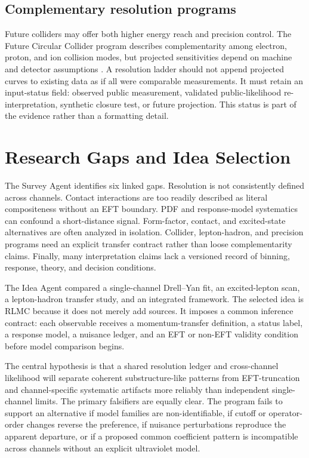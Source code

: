 \documentclass[conference]{../../../../Conference-LaTeX-template_10-17-19/IEEEtran}
\begin{document}
\subsection{Complementary resolution programs}

Future colliders may offer both higher energy reach and precision control. The Future Circular Collider program describes complementarity among electron, proton, and ion collision modes, but projected sensitivities depend on machine and detector assumptions \cite{abada2019}. A resolution ladder should not append projected curves to existing data as if all were comparable measurements. It must retain an input-status field: observed public measurement, validated public-likelihood re-interpretation, synthetic closure test, or future projection. This status is part of the evidence rather than a formatting detail.

\section{Research Gaps and Idea Selection}

The Survey Agent identifies six linked gaps. Resolution is not consistently defined across channels. Contact interactions are too readily described as literal compositeness without an EFT boundary. PDF and response-model systematics can confound a short-distance signal. Form-factor, contact, and excited-state alternatives are often analyzed in isolation. Collider, lepton-hadron, and precision programs need an explicit transfer contract rather than loose complementarity claims. Finally, many interpretation claims lack a versioned record of binning, response, theory, and decision conditions.

The Idea Agent compared a single-channel Drell--Yan fit, an excited-lepton scan, a lepton-hadron transfer study, and an integrated framework. The selected idea is RLMC because it does not merely add sources. It imposes a common inference contract: each observable receives a momentum-transfer definition, a status label, a response model, a nuisance ledger, and an EFT or non-EFT validity condition before model comparison begins.

The central hypothesis is that a shared resolution ledger and cross-channel likelihood will separate coherent substructure-like patterns from EFT-truncation and channel-specific systematic artifacts more reliably than independent single-channel limits. The primary falsifiers are equally clear. The program fails to support an alternative if model families are non-identifiable, if cutoff or operator-order changes reverse the preference, if nuisance perturbations reproduce the apparent departure, or if a proposed common coefficient pattern is incompatible across channels without an explicit ultraviolet model.
\end{document}

